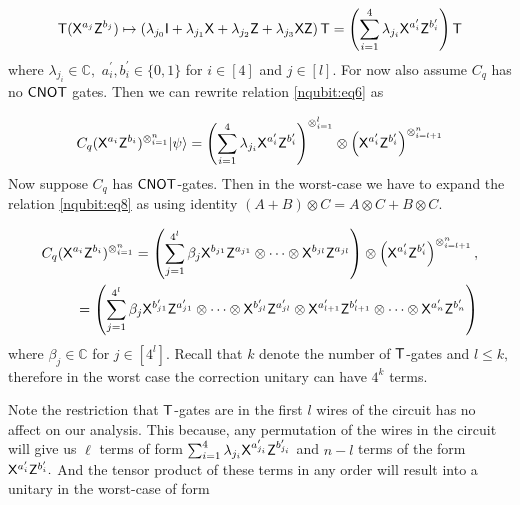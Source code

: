 \begin{equation}
\begin{aligned}
\label{nqubit:eq7}
{\sf T}({\sf X}^{a_{j}}{\sf Z}^{b_{j}})\mapsto \left(\lambda_{j_0} {\sf I} + \lambda_{j_1} {\sf X} + \lambda_{j_2} {\sf Z} + \lambda_{j_3} {\sf X} {\sf Z} \right){\sf T}=\left(\sum_{i=1}^4 \lambda_{j_i} {\sf X}^{a_{i}^\prime}{\sf Z}^{b_{i}^\prime}\right){\sf T}\\
 \end{aligned}
\end{equation}
where $\lambda_{j_i}\in\mathbb{C}, $  $a_{i}^\prime, b_{i}^\prime \in\{0,1\}$ for $i\in[4]$ and $j\in[l].$ For now also assume $C_q$ has no ${\sf CNOT}$ gates. Then we can rewrite relation \ref{nqubit:eq6} as


\begin{equation}
\label{nqubit:eq8}
\begin{aligned}
 C_q ({\sf X}^{a_{i}}{\sf Z}^{b_{i}})^{\otimes_{i=1}^{n}}{\lvert}\psi\rangle= \left(\sum_{i=1}^4 \lambda_{j_i} {\sf X}^{a_{i}^\prime}{\sf Z}^{b_{i}^\prime}\right)^{\otimes_{i=1}^{l}} \otimes \left({\sf X}^{a_{i}^\prime}{\sf Z}^{b_{i}^\prime}\right)^{\otimes_{i=l+1}^{n}}\\
\end{aligned}
\end{equation}
Now suppose $C_q$ has ${\sf CNOT}$-gates. Then in the worst-case we have to expand the relation \ref{nqubit:eq8} as using identity $(A+B)\otimes C=A\otimes C + B\otimes C.$


\begin{equation}
\label{nqubit:eq9}
\begin{aligned}
C_q ({\sf X}^{a_{i}}{\sf Z}^{b_{i}})^{\otimes_{i=1}^{n}}=\left(\sum_{j=1}^{4^l} \beta_j {\sf X}^{b_{j1}}{\sf Z}^{a_{j1}} \otimes \cdots \otimes{\sf X}^{b_{jl}}{\sf Z}^{a_{jl}}\right) \otimes \left({\sf X}^{a_{i}^\prime}{\sf Z}^{b_{i}^\prime}\right)^{\otimes_{i=l+1}^{n}}, \\
 =\left(\sum_{j=1}^{4^{l}} \beta_j {\sf X}^{b_{j1}^\prime}{\sf Z}^{a_{j1}^\prime} \otimes \cdots \otimes{\sf X}^{b_{jl}^\prime}{\sf Z}^{a_{jl}^\prime} \otimes {\sf X}^{a_{l+1}^\prime}{\sf Z}^{b_{l+1}^\prime}  \otimes \cdots   \otimes{\sf X}^{a_{n}^\prime}{\sf Z}^{b_{n}^\prime}\right)
 \end{aligned}
\end{equation}
where $\beta_j\in \mathbb{C}$ for $j\in[4^l].$  Recall that $k$ denote the number of ${\sf T}$-gates and $l\leq k,$ therefore in the worst case the correction unitary can have $4^k$ terms.

\begin{remark}
\label{remark:nqubit-correction1}
Note the restriction that ${\sf T}$-gates are in the first $l$ wires of the circuit has no affect on our analysis. This because, any permutation of the wires in the circuit will give us $\ell$ terms of form $\sum_{i=1}^4 \lambda_{j_i} {\sf X}^{a_{j_i}^\prime} {\sf Z}^{b_{j_i}^\prime}$ and $n-l$ terms of the form ${\sf X}^{a_{i}^\prime} {\sf Z}^{b_{i}^\prime}.$  And the tensor product of these terms in any order will result into a unitary in the worst-case of form
\end{remark}

